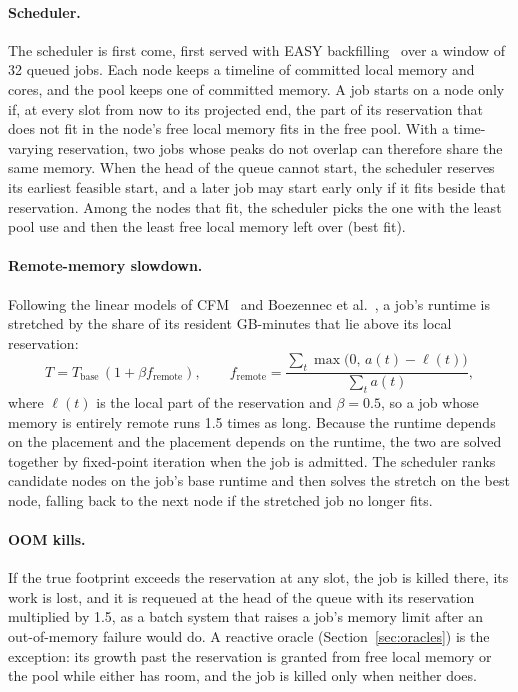 \documentclass[11pt]{article}
\newcommand{\secref}[1]{Section~\ref{#1}}
\begin{document}
\paragraph{Scheduler.} The scheduler is first come, first served with EASY backfilling~\cite{Lifka1995EASY}
over a window of 32 queued jobs. Each node keeps a timeline of committed local memory and cores, and the pool
keeps one of committed memory. A job starts on a node only if, at every slot from now to its projected end,
the part of its reservation that does not fit in the node's free local memory fits in the free pool. With a
time-varying reservation, two jobs whose peaks do not overlap can therefore share the same memory. When the
head of the queue cannot start, the scheduler reserves its earliest feasible start, and a later job may start
early only if it fits beside that reservation. Among the nodes that fit, the scheduler picks the one with the
least pool use and then the least free local memory left over (best fit).

\paragraph{Remote-memory slowdown.} Following the linear models of CFM~\cite{Amaro2020CFM} and Boezennec et
al.~\cite{Boezennec2024}, a job's runtime is stretched by the share of its resident GB-minutes that lie above
its local reservation:
\begin{equation}
T = T_{\mathrm{base}}\,(1 + \beta f_{\mathrm{remote}}), \qquad
f_{\mathrm{remote}} = \frac{\sum_t \max\bigl(0,\, a(t) - \ell(t)\bigr)}{\sum_t a(t)},
\end{equation}
where $\ell(t)$ is the local part of the reservation and $\beta = 0.5$, so a job whose memory is entirely remote
runs 1.5 times as long. Because the runtime depends on the placement and the placement depends on the runtime,
the two are solved together by fixed-point iteration when the job is admitted. The scheduler ranks candidate
nodes on the job's base runtime and then solves the stretch on the best node, falling back to the next node if
the stretched job no longer fits.

\paragraph{OOM kills.} If the true footprint exceeds the reservation at any slot, the job is killed there, its
work is lost, and it is requeued at the head of the queue with its reservation multiplied by 1.5, as a batch
system that raises a job's memory limit after an out-of-memory failure would do. A reactive oracle
(\secref{sec:oracles}) is the exception: its growth past the reservation is granted from free local memory or
the pool while either has room, and the job is killed only when neither does.
\end{document}
